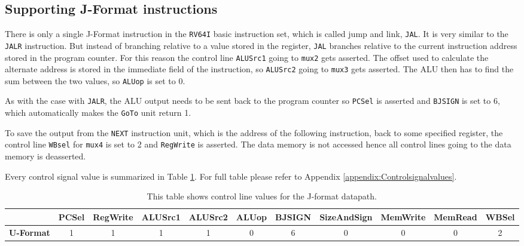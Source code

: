     \subsection{Supporting J-Format instructions}
        There is only a single J-Format instruction in the \texttt{RV64I} basic instruction set, which is called jump and link, \texttt{JAL}. It is very similar to the \texttt{JALR} instruction. But instead of branching relative to a value stored in the register, \texttt{JAL} branches relative to the current instruction address stored in the program counter. For this reason the control line \texttt{ALUSrc1} going to \texttt{mux2} gets asserted. The offset used to calculate the alternate address is stored in the immediate field of the instruction, so \texttt{ALUSrc2} going to \texttt{mux3} gets asserted. The ALU then has to find the sum between the two values, so \texttt{ALUop} is set to 0.
        
        As with the case with \texttt{JALR}, the ALU output needs to be sent back to the program counter so \texttt{PCSel} is asserted and \texttt{BJSIGN} is set to 6, which automatically makes the \texttt{GoTo} unit return 1.
        
        To save the output from the \texttt{NEXT} instruction unit, which is the address of the following instruction, back to some specified register, the control line \texttt{WBsel} for \texttt{mux4} is set to 2 and \texttt{RegWrite} is asserted. The data memory is not accessed hence all control lines going to the data memory is deasserted.
        
        Every control signal value is summarized in Table \ref{table:JFORMAT}. For full table please refer to Appendix \ref{appendix:Controlsignalvalues}.
         
        
        \begin{table}[h!]
            \small
            \hspace{-2.4cm}
            \begin{tabular}{|c||c|c|c|c|c|c|c|c|c|c|}
            	\hline
            	                  & \textbf{PCSel} & \textbf{RegWrite} & \textbf{ALUSrc1} & \textbf{ALUSrc2} & \textbf{ALUop} & \textbf{BJSIGN} & \textbf{SizeAndSign} & \textbf{MemWrite} & \textbf{MemRead} & \textbf{WBSel} \\ \hline\hline
            	\textbf{U-Format} &       1        &         1         &        1         &        1         &       0        &        6        &          0           &         0         &        0         &       2        \\ \hline
            \end{tabular}
            \caption{This table shows control line values for the J-format datapath.}
            \label{table:JFORMAT}
        \end{table}
    
